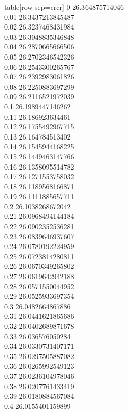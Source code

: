   table[row sep=crcr]{%
0	26.364875714046\\
0.01	26.3437213845487\\
0.02	26.3237468431984\\
0.03	26.3048835346848\\
0.04	26.2870665666506\\
0.05	26.2702346542326\\
0.06	26.2543300265767\\
0.07	26.2392983061826\\
0.08	26.2250883697299\\
0.09	26.2116521972039\\
0.1	26.1989447146262\\
0.11	26.186923634461\\
0.12	26.1755492967715\\
0.13	26.164784513402\\
0.14	26.1545944168225\\
0.15	26.1449463147766\\
0.16	26.1358095514782\\
0.17	26.1271553758032\\
0.18	26.1189568166871\\
0.19	26.1111885657711\\
0.2	26.1038268672042\\
0.21	26.0968494144184\\
0.22	26.0902352536281\\
0.23	26.0839646937607\\
0.24	26.0780192224959\\
0.25	26.0723814280811\\
0.26	26.0670349265802\\
0.27	26.0619642942188\\
0.28	26.0571550044952\\
0.29	26.0525933697354\\
0.3	26.0482664867886\\
0.31	26.0441621865686\\
0.32	26.0402689871678\\
0.33	26.036576050284\\
0.34	26.0330731407171\\
0.35	26.0297505887082\\
0.36	26.0265992549123\\
0.37	26.0236104978046\\
0.38	26.0207761433419\\
0.39	26.0180884567084\\
0.4	26.0155401159899\\
}
